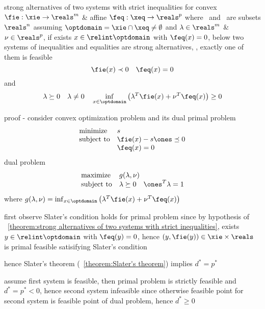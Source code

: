 \documentclass[17pt,landscape]{foils}
\begin{document}
{\begin{mytheorem}{strong alternatives of two systems with strict inequalities}
	for convex $\fie: \xie\to\reals^m$ \& affine $\feq:\xeq\to\reals^p$
	where \xie\ and \xeq\ are subsets $\reals^n$
	assuming $\optdomain = \xie \cap \xeq \neq \emptyset$
	and
	$\lambda\in\reals^m$ \& $\nu\in\reals^p$,
	if exists $x \in \relint \optdomain$ with $\feq(x)=0$,
	below two systems of inequalities and equalities are strong alternatives,
	\ie, exactly one of them is feasible
		$$
				\fie(x) \prec 0%
				\quad
				\feq(x) =0
		$$
		and
		$$
				\lambda \succeq 0
				\quad
				\lambda \neq 0
				\quad
				\inf_{x\in\optdomain}
				\left(
					\lambda^T \fie(x) + \nu^T \feq(x)
				\right)
				\geq
				0
		$$
\end{mytheorem}

\bit
\vitem
	proof -
	consider convex optimization problem and its dual
	\bit
	\vitem
		primal problem
		$$
			\begin{array}{ll}
				\mbox{minimize} &
					s
				\\
				\mbox{subject to} &
					\fie(x) - s \ones \preceq 0
				\\ &
					\feq(x) =0
			\end{array}
		$$
	\vitem
		dual problem
		$$
			\begin{array}{ll}
				\mbox{maximize} &
					g(\lambda,\nu)
				\\
				\mbox{subject to} &
					\lambda \succeq 0
					\quad
					\ones^T \lambda = 1
			\end{array}
		$$
		where
		$
				g(\lambda,\nu)
				=
				\inf_{x\in\optdomain}
				\left(
					\lambda^T \fie(x) + \nu^T \feq(x)
				\right)
		$
	\eit

\vitem
	first observe Slater's condition
	holds for primal problem
	since by hypothesis of \theoremname~\ref{theorem:strong alternatives of two systems with strict inequalities},
	exists $y\in\relint \optdomain$ with $\feq(y)=0$,
	hence $(y,\fie(y))\in\xie\times \reals$
	is primal feasible satisifying Slater's condition

\vitem
	hence Slater's theorem (\theoremname~\ref{theorem:Slater's theorem})
	implies
	$d^\ast=p^\ast$

\vitem
	assume first system
	is feasible,
	then primal problem is strictly feasible and $d^\ast = p^\ast<0$,
	hence second system infeasible
	since otherwise
	feasible point for second system
	is feasible point of dual problem,
	hence $d^\ast\geq0$

}
\end{document}
